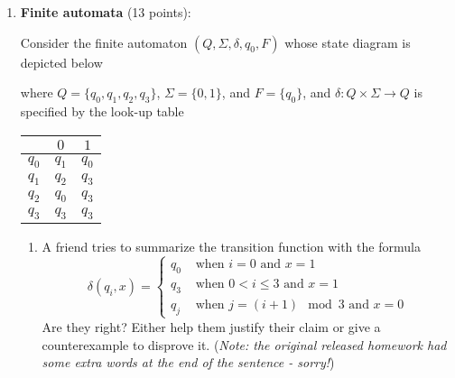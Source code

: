 \begin{enumerate}[wide, labelwidth=!, labelindent=0pt]
\item\gradeCorrect \textbf{Finite automata} (13 points):

Consider the finite automaton $(Q, \Sigma, \delta, q_0, F)$ whose state diagram is depicted below
\begin{center}
\end{center}
where $Q = \{q_0, q_1, q_2, q_3\}$, $\Sigma = \{0,1\}$, and $F = \{q_0\}$, and $\delta: Q \times \Sigma \to Q$
is specified by the look-up table
\begin{center}
\begin{tabular}{c|cc}
        & $0$ & $1$ \\
    \hline
  $q_0$ & $q_1$ & $q_0$ \\
  $q_1$ & $q_2$ & $q_3$ \\
  $q_2$ & $q_0$ & $q_3$ \\
  $q_3$ & $q_3$ & $q_3$
\end{tabular}
\end{center}
    \begin{enumerate}
    \item  A friend tries to summarize the transition function with the formula
    \[
        \delta(q_i,x) = \begin{cases}
            q_0 &\text{ when $i=0$ and $x=1$} \\
            q_3 &\text{ when $0<i\leq 3$ and $x=1$}\\
            q_j &\text{ when $j = (i+1) \mod 3$ and $x=0$}
        \end{cases}
    \]
    Are they right? Either help them justify their claim or give a counterexample to disprove it.
    ({\it Note: the original released homework had some extra words at the end of the sentence - sorry!})


\end{enumerate}
\end{enumerate}
